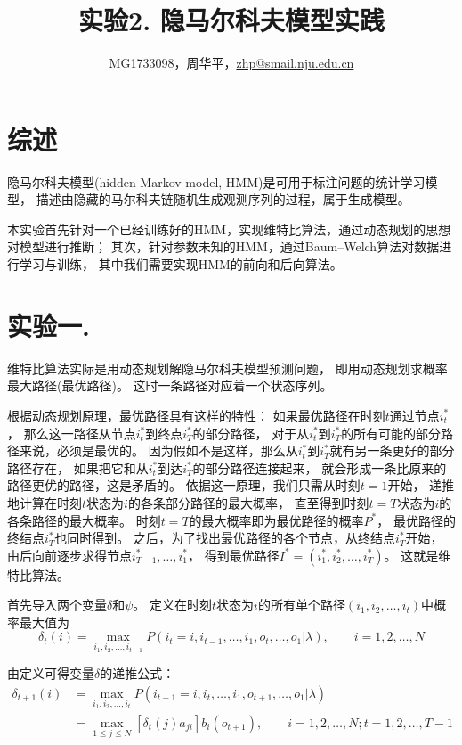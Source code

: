 \documentclass[a4paper,UTF8]{article}
\theoremstyle{definition}
\begin{document}
\title{实验2. 隐马尔科夫模型实践}
\author{MG1733098，周华平，\url{zhp@smail.nju.edu.cn}}
\maketitle

\section*{综述}

隐马尔科夫模型(hidden Markov model, HMM)是可用于标注问题的统计学习模型，
描述由隐藏的马尔科夫链随机生成观测序列的过程，属于生成模型。

本实验首先针对一个已经训练好的HMM，实现维特比算法，通过动态规划的思想对模型进⾏推断；
其次，针对参数未知的HMM，通过Baum–Welch算法对数据进行学习与训练，
其中我们需要实现HMM的前向和后向算法。

\section*{实验一.}

维特比算法实际是用动态规划解隐马尔科夫模型预测问题，
即用动态规划求概率最大路径(最优路径)。
这时一条路径对应着一个状态序列。

根据动态规划原理，最优路径具有这样的特性：
如果最优路径在时刻$t$通过节点$i_t^*$，
那么这一路径从节点$i_t^*$到终点$i_T^*$的部分路径，
对于从$i_t^*$到$i_T^*$的所有可能的部分路径来说，必须是最优的。
因为假如不是这样，那么从$i_t^*$到$i_T^*$就有另一条更好的部分路径存在，
如果把它和从$i_t^*$到达$i_T^*$的部分路径连接起来，
就会形成一条比原来的路径更优的路径，这是矛盾的。
依据这一原理，我们只需从时刻$t=1$开始，
递推地计算在时刻$t$状态为$i$的各条部分路径的最大概率，
直至得到时刻$t=T$状态为$i$的各条路径的最大概率。
时刻$t=T$的最大概率即为最优路径的概率$P^*$，
最优路径的终结点$i_T^*$也同时得到。
之后，为了找出最优路径的各个节点，从终结点$i_T^*$开始，
由后向前逐步求得节点$i_{T-1}^*,\dots,i_1^*$，
得到最优路径$I^*=(i_1^*,i_2^*,\dots,i_T^*)$。
这就是维特比算法。

首先导入两个变量$\delta$和$\psi$。
定义在时刻$t$状态为$i$的所有单个路径$(i_1,i_2,\dots,i_t)$中概率最大值为
\[
	\delta_t(i)=\max_{i_1,i_2,\dots,i_{t-1}} P(i_t=i,i_{t-1},\dots,i_1,o_t,\dots,o_1 \vert \lambda),\qquad
	i=1,2,\dots,N
\]

由定义可得变量$\delta$的递推公式：
\begin{align*}
	\delta_{t+1}(i)&=\max_{i_1,i_2,\dots,i_t} P(i_{t+1}=i,i_t,\dots,i_1,o_{t+1},\dots,o_1 \vert \lambda) \\
	&=\max_{1 \leq j \leq N}[\delta_t(j)a_{ji}]b_i(o_{t+1}),\qquad
	i=1,2,\dots,N; t=1,2,\dots,T-1
\end{align*}
\end{document}

